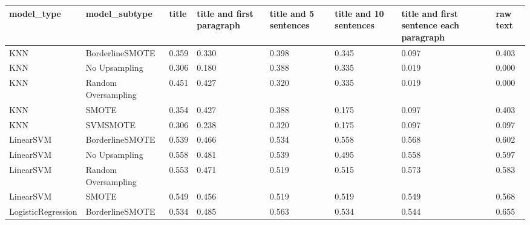\begin{tabular}{llllllll}
\toprule
                  model\_type &       model\_subtype &     title & title and first paragraph & title and 5 sentences & title and 10 sentences & title and first sentence each paragraph &  raw text \\
\midrule
                         KNN &     BorderlineSMOTE &     0.359 &                     0.330 &                 0.398 &                  0.345 &                                   0.097 &     0.403 \\
                         KNN &       No Upsampling &     0.306 &                     0.180 &                 0.388 &                  0.335 &                                   0.019 &     0.000 \\
                         KNN & Random Oversampling &     0.451 &                     0.427 &                 0.320 &                  0.335 &                                   0.019 &     0.000 \\
                         KNN &               SMOTE &     0.354 &                     0.427 &                 0.388 &                  0.175 &                                   0.097 &     0.403 \\
                         KNN &            SVMSMOTE &     0.306 &                     0.238 &                 0.320 &                  0.175 &                                   0.097 &     0.097 \\
                   LinearSVM &     BorderlineSMOTE &     0.539 &                     0.466 &                 0.534 &                  0.558 &                                   0.568 &     0.602 \\
                   LinearSVM &       No Upsampling &     0.558 &                     0.481 &                 0.539 &                  0.495 &                                   0.558 &     0.597 \\
                   LinearSVM & Random Oversampling &     0.553 &                     0.471 &                 0.519 &                  0.515 &                                   0.573 &     0.583 \\
                   LinearSVM &               SMOTE &     0.549 &                     0.456 &                 0.519 &                  0.519 &                                   0.549 &     0.568 \\
          LogisticRegression &     BorderlineSMOTE &     0.534 &                     0.485 &                 0.563 &                  0.534 &                                   0.544 &     0.655 \\

\end{tabular}
